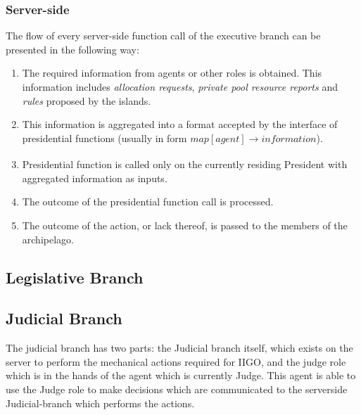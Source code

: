 \subsubsection{Server-side}
\label{sub:president:server-side}


The flow of every server-side function call of the executive branch can be presented in the following way:
\begin{enumerate}
    \item The required information from agents or other roles is obtained. This information includes \emph{allocation requests}, \emph{private pool resource reports} and \emph{rules} proposed by the islands.
    \item This information is aggregated into a format accepted by the interface of presidential functions (usually in form $map[agent] \xrightarrow[]{} information$).
    \item Presidential function is called only on the currently residing President with aggregated information as inputs.
    \item The outcome of the presidential function call is processed.
    \item The outcome of the action, or lack thereof, is passed to the members of the archipelago.
\end{enumerate}

\subsection{Legislative Branch}
\subsection{Judicial Branch}
The judicial branch has two parts: the Judicial branch itself, which exists on the server to perform the mechanical actions required for IIGO, and the judge role which is in the hands of the agent which is currently Judge. This agent is able to use the Judge role to make decisions which  are communicated to the serverside Judicial-branch which performs the actions.
